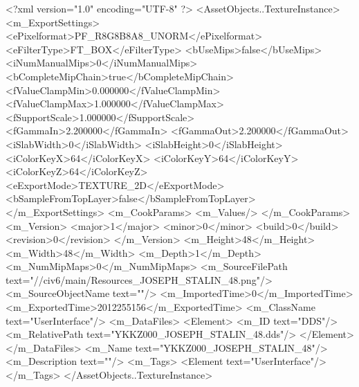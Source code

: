 <?xml version="1.0" encoding="UTF-8" ?>
<AssetObjects..TextureInstance>
	<m_ExportSettings>
		<ePixelformat>PF_R8G8B8A8_UNORM</ePixelformat>
		<eFilterType>FT_BOX</eFilterType>
		<bUseMips>false</bUseMips>
		<iNumManualMips>0</iNumManualMips>
		<bCompleteMipChain>true</bCompleteMipChain>
		<fValueClampMin>0.000000</fValueClampMin>
		<fValueClampMax>1.000000</fValueClampMax>
		<fSupportScale>1.000000</fSupportScale>
		<fGammaIn>2.200000</fGammaIn>
		<fGammaOut>2.200000</fGammaOut>
		<iSlabWidth>0</iSlabWidth>
		<iSlabHeight>0</iSlabHeight>
		<iColorKeyX>64</iColorKeyX>
		<iColorKeyY>64</iColorKeyY>
		<iColorKeyZ>64</iColorKeyZ>
		<eExportMode>TEXTURE_2D</eExportMode>
		<bSampleFromTopLayer>false</bSampleFromTopLayer>
	</m_ExportSettings>
	<m_CookParams>
		<m_Values/>
	</m_CookParams>
	<m_Version>
		<major>1</major>
		<minor>0</minor>
		<build>0</build>
		<revision>0</revision>
	</m_Version>
	<m_Height>48</m_Height>
	<m_Width>48</m_Width>
	<m_Depth>1</m_Depth>
	<m_NumMipMaps>0</m_NumMipMaps>
	<m_SourceFilePath text="//civ6/main/Resources_JOSEPH_STALIN_48.png"/>
	<m_SourceObjectName text=""/>
	<m_ImportedTime>0</m_ImportedTime>
	<m_ExportedTime>2012255156</m_ExportedTime>
	<m_ClassName text="UserInterface"/>
	<m_DataFiles>
		<Element>
			<m_ID text="DDS"/>
			<m_RelativePath text="YKKZ000_JOSEPH_STALIN_48.dds"/>
		</Element>
	</m_DataFiles>
	<m_Name text="YKKZ000_JOSEPH_STALIN_48"/>
	<m_Description text=""/>
	<m_Tags>
		<Element text="UserInterface"/>
	</m_Tags>
</AssetObjects..TextureInstance>

